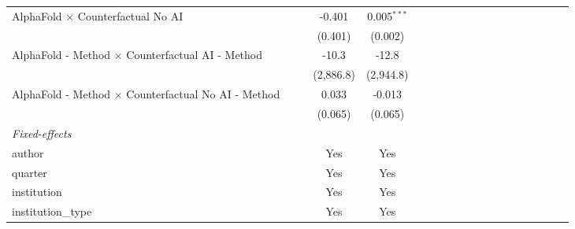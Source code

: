 \begin{tabular}{lcccccccccccccccccc}
   AlphaFold $\times$ Counterfactual No AI                    &       &       & -0.401        & 0.005$^{***}$  &       &       &       &       &     &      &      &      &      &      &      &      &      &   \\   
                                                              &       &       & (0.401)       & (0.002)        &       &       &       &       &     &      &      &      &      &      &      &      &      &   \\   
   AlphaFold - Method $\times$ Counterfactual AI - Method     &       &       & -10.3         & -12.8          &       &       &       &       &     &      &      &      &      &      &      &      &      &   \\   
                                                              &       &       & (2,886.8)     & (2,944.8)      &       &       &       &       &     &      &      &      &      &      &      &      &      &   \\   
   AlphaFold - Method $\times$ Counterfactual No AI - Method  &       &       & 0.033         & -0.013         &       &       &       &       &     &      &      &      &      &      &      &      &      &   \\   
                                                              &       &       & (0.065)       & (0.065)        &       &       &       &       &     &      &      &      &      &      &      &      &      &   \\   
   \midrule
   \emph{Fixed-effects}\\
   author                                                     &       &       & Yes           & Yes            &       &       &       &       &     &      &      &      &      &      &      &      &      & \\  
   quarter                                                    &       &       & Yes           & Yes            &       &       &       &       &     &      &      &      &      &      &      &      &      & \\  
   institution                                                &       &       & Yes           & Yes            &       &       &       &       &     &      &      &      &      &      &      &      &      & \\  
   institution\_type                                          &       &       & Yes           & Yes            &       &       &       &       &     &      &      &      &      &      &      &      &      & \\  

\end{tabular}
